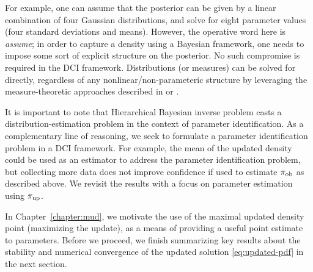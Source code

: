 For example, one can assume that the posterior can be given by a linear combination of four Gaussian distributions, and solve for eight parameter values (four standard deviations and means).
However, the operative word here is \emph{assume}; in order to capture a density using a Bayesian framework, one needs to impose some sort of explicit structure on the posterior.
No such compromise is required in the DCI framework.
Distributions (or measures) can be solved for directly, regardless of any nonlinear/non-parameteric structure by leveraging the measure-theoretic approaches described in \cite{BE13} or \cite{BJW18a}.

It is important to note that Hierarchical Bayesian inverse problem casts a distribution-estimation problem in the context of parameter identification.
As a complementary line of reasoning, we seek to formulate a parameter identification problem in a DCI framework.
For example, the mean of the updated density could be used as an estimator to address the parameter identification problem, but collecting more data does not improve confidence if used to estimate $\operatorname*{\pi_{ob}}$ as described above.
We revisit the results with a focus on parameter estimation using $\operatorname*{\pi_{up}}$.

In Chapter~\ref{chapter:mud}, we motivate the use of the maximal updated density point (maximizing the update), as a means of providing a useful point estimate to parameters.
Before we proceed, we finish summarizing key results about the stability and numerical convergence of the updated solution \eqref{eq:updated-pdf} in the next section.

\FloatBarrier
